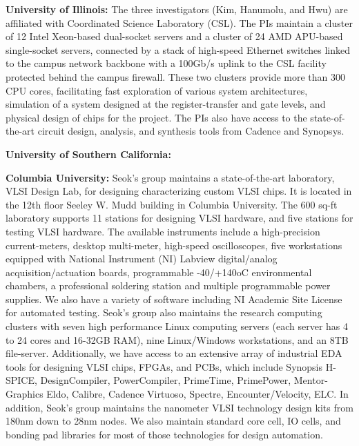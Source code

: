 \noindent
\textbf{University of Illinois:}
The three investigators (Kim, Hanumolu, and Hwu) are affiliated with Coordinated Science Laboratory (CSL). 
The PIs maintain a cluster of 12 Intel Xeon-based dual-socket servers and a cluster of 24 AMD APU-based single-socket servers, connected by a stack of high-speed Ethernet switches linked to the campus network backbone with a 100Gb/s uplink to the CSL facility protected behind the campus firewall.
These two clusters provide more than 300 CPU cores, facilitating fast exploration of various system architectures, simulation of a system designed at the register-transfer and gate levels, and physical design of chips for the project.
The PIs also have access to the state-of-the-art circuit design, analysis, and synthesis tools from Cadence and Synopsys.

\noindent
\textbf{University of Southern California:}

\noindent
\textbf{Columbia University:}
Seok’s group maintains a state-of-the-art laboratory, VLSI Design Lab, for designing characterizing custom VLSI chips. It is located in the 12th floor Seeley W. Mudd building in Columbia University. The 600 sq-ft laboratory supports 11 stations for designing VLSI hardware, and five stations for testing VLSI hardware. The available instruments include a high-precision current-meters, desktop multi-meter, high-speed oscilloscopes, five workstations equipped with National Instrument (NI) Labview digital/analog acquisition/actuation boards, programmable -40/+140oC environmental chambers, a professional soldering station and multiple programmable power supplies. We also have a variety of software including NI Academic Site License for automated testing. 
Seok’s group also maintains the research computing clusters with seven high performance Linux computing servers (each server has 4 to 24 cores and 16-32GB RAM), nine Linux/Windows workstations, and an 8TB file-server. Additionally, we have access to an extensive array of industrial EDA tools for designing VLSI chips, FPGAs, and PCBs, which include Synopsis H-SPICE, DesignCompiler, PowerCompiler, PrimeTime, PrimePower, Mentor-Graphics Eldo, Calibre, Cadence Virtuoso, Spectre, Encounter/Velocity, ELC. In addition, Seok’s group maintains the nanometer VLSI technology design kits from 180nm down to 28nm nodes. We also maintain standard core cell, IO cells, and bonding pad libraries for most of those technologies for design automation. 

